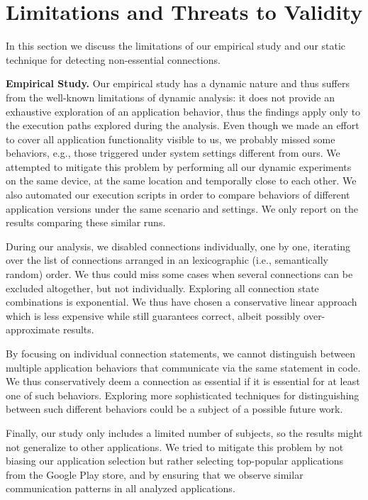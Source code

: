 \section{Limitations and Threats to Validity}
\label{sec:limitations}
In this section we discuss the limitations of our empirical study and our static technique for detecting non-essential connections.

\vspace{0.1in}
\noindent 
{\bf Empirical Study.}
Our empirical study has a dynamic nature and thus suffers from the well-known limitations of dynamic analysis: it does not provide an exhaustive exploration of an application behavior, thus the findings apply only to the execution paths explored during the analysis. 
Even though we made an effort to cover all application functionality visible to us, we probably missed some behaviors, e.g., those triggered under system settings different from ours. 
We attempted to mitigate this problem by performing all our dynamic experiments on the same device, at the same location and temporally close to each other.  
We also automated our execution scripts in order to compare behaviors of different application versions under the same scenario and settings. 
We only report on the results comparing these similar runs.  

During our analysis, we disabled connections individually, one by one, iterating over the list of connections arranged in an lexicographic (i.e., semantically random) order. We thus could miss some cases when 
several connections can be excluded altogether, but not individually. 
Exploring all connection state combinations is exponential. 
We thus have chosen a conservative linear approach which is less expensive while still guarantees correct, 
albeit possibly over-approximate results. 

By focusing on individual connection statements, we cannot distinguish between multiple application behaviors
that communicate via the same statement in code. We thus conservatively deem a connection as essential if it is essential for at least one of such behaviors. Exploring more sophisticated techniques for distinguishing between such different behaviors could be a subject of a possible future work.
 
Finally, our study only includes a limited number of subjects, so the results might not generalize to other applications.
We tried to mitigate this problem by not biasing our application selection but rather selecting top-popular applications from the Google Play store, and by ensuring that we observe similar communication patterns in all analyzed applications.

